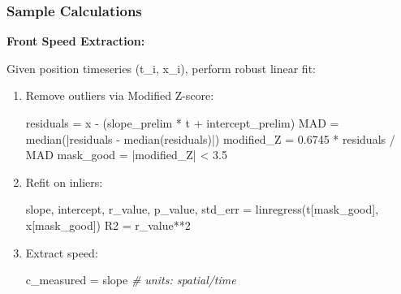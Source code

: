 \documentclass[
]{article}
\newenvironment{Shaded}{}{}
\newcommand{\CommentTok}[1]{\textcolor[rgb]{0.38,0.63,0.69}{\textit{#1}}}
\newcommand{\DecValTok}[1]{\textcolor[rgb]{0.25,0.63,0.44}{#1}}
\newcommand{\FloatTok}[1]{\textcolor[rgb]{0.25,0.63,0.44}{#1}}
\newcommand{\NormalTok}[1]{#1}
\newcommand{\OperatorTok}[1]{\textcolor[rgb]{0.40,0.40,0.40}{#1}}
\begin{document}
\hypertarget{sample-calculations}{%
\subsubsection{Sample Calculations}\label{sample-calculations}}

\textbf{Front Speed Extraction:}

Given position timeseries (t\_i, x\_i), perform robust linear fit:

\begin{enumerate}
\def\labelenumi{\arabic{enumi}.}
\item
  Remove outliers via Modified Z-score:

\begin{Shaded}
\begin{Highlighting}[]
\NormalTok{residuals }\OperatorTok{=}\NormalTok{ x }\OperatorTok{{-}}\NormalTok{ (slope\_prelim }\OperatorTok{*}\NormalTok{ t }\OperatorTok{+}\NormalTok{ intercept\_prelim)}
\NormalTok{MAD }\OperatorTok{=}\NormalTok{ median(}\OperatorTok{|}\NormalTok{residuals }\OperatorTok{{-}}\NormalTok{ median(residuals)}\OperatorTok{|}\NormalTok{)}
\NormalTok{modified\_Z }\OperatorTok{=} \FloatTok{0.6745} \OperatorTok{*}\NormalTok{ residuals }\OperatorTok{/}\NormalTok{ MAD}
\NormalTok{mask\_good }\OperatorTok{=} \OperatorTok{|}\NormalTok{modified\_Z}\OperatorTok{|} \OperatorTok{\textless{}} \FloatTok{3.5}
\end{Highlighting}
\end{Shaded}
\item
  Refit on inliers:

\begin{Shaded}
\begin{Highlighting}[]
\NormalTok{slope, intercept, r\_value, p\_value, std\_err }\OperatorTok{=}\NormalTok{ linregress(t[mask\_good], x[mask\_good])}
\NormalTok{R2 }\OperatorTok{=}\NormalTok{ r\_value}\OperatorTok{**}\DecValTok{2}
\end{Highlighting}
\end{Shaded}
\item
  Extract speed:

\begin{Shaded}
\begin{Highlighting}[]
\NormalTok{c\_measured }\OperatorTok{=}\NormalTok{ slope  }\CommentTok{\# units: spatial/time}
\end{Highlighting}
\end{Shaded}
\end{enumerate}
\end{document}
